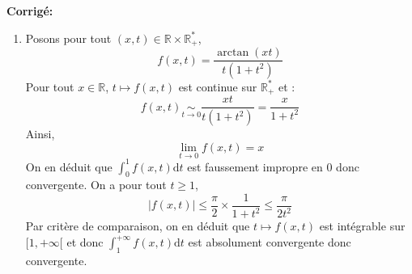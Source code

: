 \documentclass[a4paper,twoside,french,11pt]{VcCours}
\newcommand{\dt}{\text{d}t}
\newcommand{\corr}{\textbf{Corrigé:}}
\begin{document}
\corr  
\begin{enumerate}
\item Posons pour tout $(x,t) \in \mathbb{R} \times \mathbb{R}_+^{*}$,
$$ f(x,t) = \dfrac{\arctan(xt)}{t(1+t^2)}$$
Pour tout $x \in \mathbb{R}$, $t \mapsto f(x,t)$ est continue sur $\mathbb{R}_+^{*}$ et :
$$ f(x,t) \underset{ t \rightarrow 0 }{\sim} \dfrac{xt}{t(1+t^2)} = \dfrac{x}{1+t^2}$$
Ainsi,
$$ \lim_{t \rightarrow 0 } f(x,t) = x$$
On en déduit que $\int_{0}^1 f(x,t) \dt$ est faussement impropre en $0$ donc convergente. On a pour tout $t \geq 1$,
$$ \vert f(x,t) \vert \leq \dfrac{\pi}{2} \times \dfrac{1}{1+t^2} \leq \dfrac{\pi}{2t^2}$$
Par critère de comparaison, on en déduit que $t \mapsto f(x,t)$ est intégrable sur $[1,+ \infty[$ et donc $\int_{1}^{+ \infty} f(x,t) \dt$ est absolument convergente donc convergente.



\end{enumerate}
\end{document}

